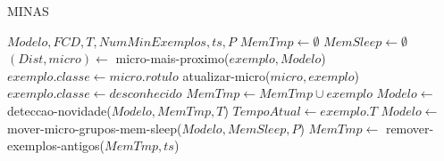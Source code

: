 \begin{algorithm}[ht]
  \caption{MINAS \cite{Faria2016minas,Cassales2019a}}
  \label{alg:MINAS}
  \renewcommand{\algorithmicrequire}{\textbf{Entrada:}}
  \begin{algorithmic}[1]
    \REQUIRE $Modelo,FCD,T,NumMinExemplos,ts,P$
    \STATE $MemTmp \leftarrow \emptyset$
    \STATE $MemSleep \leftarrow \emptyset$
    \STATE $(Dist,micro) \leftarrow$ micro-mais-proximo($exemplo,Modelo$)
    \STATE $exemplo.classe \leftarrow micro.rotulo$
    \STATE atualizar-micro($micro,exemplo$)
    \ELSE
    \STATE $exemplo.classe \leftarrow desconhecido$
    \STATE $MemTmp \leftarrow MemTmp \cup exemplo$
    \STATE $Modelo \leftarrow $ deteccao-novidade($Modelo,MemTmp,T$)
    \ENDIF
    \ENDIF
    \STATE $TempoAtual \leftarrow exemplo.T$
    \STATE $Modelo \leftarrow$ mover-micro-grupos-mem-sleep($Modelo,MemSleep,P$)
    \STATE $MemTmp \leftarrow$ remover-exemplos-antigos($MemTmp,ts$)
    \ENDIF
    \ENDFOR
  \end{algorithmic}
\end{algorithm}


